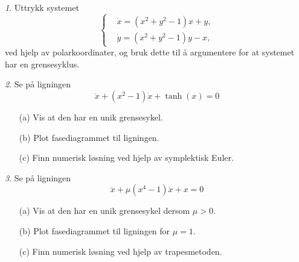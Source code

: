 \documentclass{article}
\theoremstyle{plain}
\theoremstyle{definition}
\theoremstyle{remark}
\newtheorem{oppg}{}
\begin{document}
\begin{oppg}
    Uttrykk systemet
    \begin{equation*}
        \left\{
            \begin{aligned}
                & \dot{x} = (x^2 + y^2 - 1)x + y, \\
                & \dot{y} = (x^2 + y^2 - 1)y - x,
            \end{aligned}    
        \right.
    \end{equation*}
    ved hjelp av polarkoordinater, og bruk dette til å argumentere for at systemet har en grensesyklus.
\end{oppg}

\begin{oppg}
    Se på ligningen
    \begin{equation*}
        \ddot{x} + (x^2 - 1) \dot{x} + \tanh(x) = 0
    \end{equation*}
    \begin{itemize}
        \item[(a)] Vis at den har en unik grensesykel.
        \item[(b)] Plot fasediagrammet til ligningen.
        \item[(c)] Finn numerisk løsning ved hjelp av symplektisk Euler.
    \end{itemize}
\end{oppg}

\begin{oppg}
    Se på ligningen
    \begin{equation*}
        \ddot{x} + \mu (x^4 - 1) \dot{x} + x = 0
    \end{equation*}
    \begin{itemize}
        \item[(a)] Vis at den har en unik grensesykel dersom $\mu > 0$.
        \item[(b)] Plot fasediagrammet til ligningen for $\mu = 1$.
        \item[(c)] Finn numerisk løsning ved hjelp av trapesmetoden.
    \end{itemize}
\end{oppg}
\end{document}
